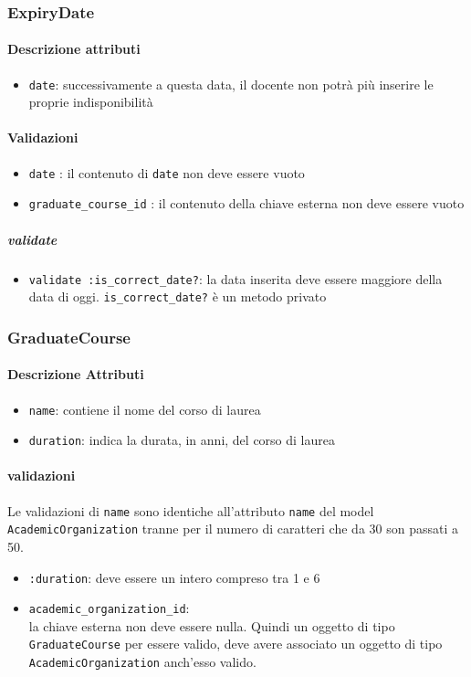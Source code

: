 \documentclass[11pt,a4paper]{article}
\begin{document}
\subsubsection{ExpiryDate}
\paragraph{Descrizione attributi}
\begin{itemize}
 \item \verb|date|: successivamente a questa data, il docente non potrà più inserire le proprie indisponibilità
\end{itemize}
\paragraph{Validazioni}
\begin{itemize}
 \item \verb|date| : il contenuto di \verb|date| non deve essere vuoto
 \item \verb|graduate_course_id| : il contenuto della chiave esterna non deve essere vuoto
\end{itemize}
\subparagraph{validate}
\begin{itemize}
 \item \verb|validate :is_correct_date?|: la data inserita deve essere maggiore della data di oggi. \verb|is_correct_date?| è un metodo privato
\end{itemize}

\subsubsection{GraduateCourse}
\paragraph{Descrizione Attributi}
\begin{itemize}
 \item \verb|name|: contiene il nome del corso di laurea
 \item \verb|duration|: indica la durata, in anni, del corso di laurea
\end{itemize}
\paragraph{validazioni}
Le validazioni di \verb|name| sono identiche all'attributo \verb|name| del model \verb|AcademicOrganization| tranne per il numero di caratteri che da 30 son passati a 50.
\begin{itemize}
\item \verb|:duration|: deve essere un intero compreso tra 1 e 6
\item \verb|academic_organization_id|:\\ la chiave esterna non deve essere nulla. Quindi un oggetto di tipo \verb|GraduateCourse| per essere valido, deve avere associato un oggetto di tipo \verb|AcademicOrganization| anch'esso valido.
\end{itemize}
\end{document}
